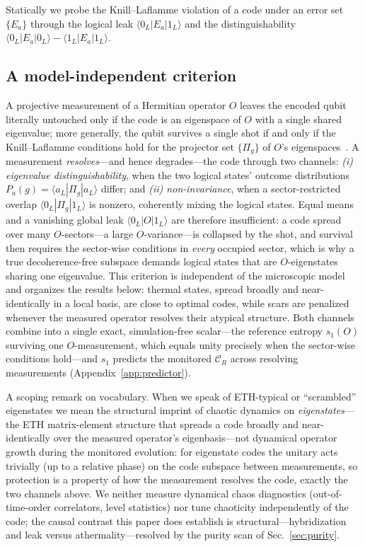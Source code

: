 \documentclass[aps,prb,twocolumn]{revtex4-2}
\newcommand{\CR}{\mathcal{C}_R}
\begin{document}
Statically we probe the Knill--Laflamme violation of a code under an error set
$\{E_a\}$ through the logical leak $\langle 0_L|E_a|1_L\rangle$ and the
distinguishability $\langle0_L|E_a|0_L\rangle-\langle1_L|E_a|1_L\rangle$.

\subsection{A model-independent criterion}
\label{sec:criterion}
A projective measurement of a Hermitian operator $O$ leaves the encoded qubit
literally untouched only if the code is an eigenspace of $O$ with a single
shared eigenvalue; more generally, the qubit survives a single shot if and only
if the Knill--Laflamme conditions hold for the projector set $\{\Pi_g\}$ of
$O$'s eigenspaces~\cite{KnillLaflamme1997}. A measurement \emph{resolves}---and
hence degrades---the code through two channels: \emph{(i) eigenvalue
distinguishability}, when the two logical states' outcome distributions
$P_a(g)=\langle a_L|\Pi_g|a_L\rangle$ differ; and \emph{(ii) non-invariance},
when a sector-restricted overlap $\langle0_L|\Pi_g|1_L\rangle$ is nonzero,
coherently mixing the logical states. Equal means and a vanishing global leak
$\langle0_L|O|1_L\rangle$ are therefore insufficient: a code spread over many
$O$-sectors---a large $O$-variance---is collapsed by the shot, and survival then
requires the sector-wise conditions in \emph{every} occupied sector, which is
why a true decoherence-free subspace demands logical states that are
$O$-eigenstates sharing one eigenvalue. This criterion is independent of the
microscopic model and organizes the results below: thermal states, spread
broadly and near-identically in a local basis, are close to optimal codes,
while scars are penalized whenever the measured operator resolves their
atypical structure. Both channels combine into a single exact, simulation-free
scalar---the reference entropy $s_1(O)$ surviving one $O$-measurement, which
equals unity precisely when the sector-wise conditions hold---and $s_1$
predicts the monitored $\CR$ across resolving measurements
(Appendix~\ref{app:predictor}).

A scoping remark on vocabulary. When we speak of ETH-typical or
``scrambled'' eigenstates we mean the structural imprint of chaotic dynamics
on \emph{eigenstates}---the ETH
matrix-element structure that spreads a code broadly and near-identically
over the measured operator's eigenbasis---not dynamical operator growth
during the monitored evolution: for eigenstate codes the unitary acts
trivially (up to a relative phase) on the code subspace between measurements,
so protection is a property of how the measurement resolves the code, exactly
the two channels above. We neither measure dynamical chaos diagnostics
(out-of-time-order correlators, level statistics) nor tune chaoticity
independently of the code; the causal contrast this paper does establish is
structural---hybridization and leak versus athermality---resolved by the
purity scan of Sec.~\ref{sec:purity}.
\end{document}
